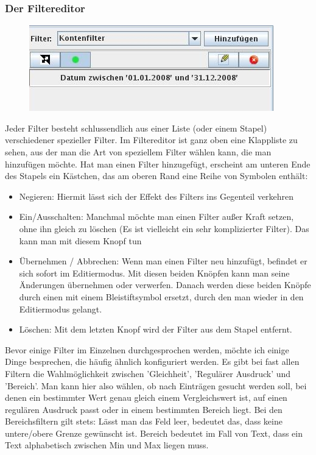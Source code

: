 \documentclass[a4paper,10pt,halfparskip,oneside,smallheadings]{scrbook}
\begin{document}
\subsubsection{Der Filtereditor}
\begin{figure}[h]
 \includegraphics{filtereditor1}
\end{figure}
Jeder Filter besteht schlussendlich aus einer Liste (oder einem Stapel) verschiedener spezieller Filter. Im Filtereditor ist ganz oben eine Klappliste zu sehen, aus der man die Art von speziellem Filter wählen kann, die man hinzufügen möchte. 
Hat man einen Filter hinzugefügt, erscheint am unteren Ende des Stapels ein Kästchen, das am oberen Rand eine Reihe von Symbolen enthält:
\begin{itemize}
 \item Negieren: Hiermit lässt sich der Effekt des Filters ins Gegenteil verkehren
 \item Ein/Ausschalten: Manchmal möchte man einen Filter außer Kraft setzen, ohne ihn gleich zu löschen (Es ist vielleicht ein sehr komplizierter Filter). Das kann man mit diesem Knopf tun
 \item Übernehmen / Abbrechen: Wenn man einen Filter neu hinzufügt, befindet er sich sofort im Editiermodus. Mit diesen beiden Knöpfen kann man seine Änderungen übernehmen oder verwerfen. Danach werden diese beiden Knöpfe durch einen mit einem Bleistiftsymbol ersetzt, durch den man wieder in den Editiermodus gelangt. 
 \item Löschen: Mit dem letzten Knopf wird der Filter aus dem Stapel entfernt.
\end{itemize}
Bevor einige Filter im Einzelnen durchgesprochen werden, möchte ich einige Dinge besprechen, die häufig ähnlich konfiguriert werden. Es gibt bei fast allen Filtern die Wahlmöglichkeit zwischen 'Gleichheit', 'Regulärer Ausdruck' und 'Bereich'. Man kann hier also wählen, ob nach Einträgen gesucht werden soll, bei denen ein bestimmter Wert genau gleich einem Vergleichswert ist, auf einen regulären Ausdruck passt oder in einem bestimmten Bereich liegt. Bei den Bereichsfiltern gilt stets: Lässt man das Feld leer, bedeutet das, dass keine untere/obere Grenze gewünscht ist. Bereich bedeutet im Fall von Text, dass ein Text alphabetisch zwischen Min und Max liegen muss.
\end{document}
